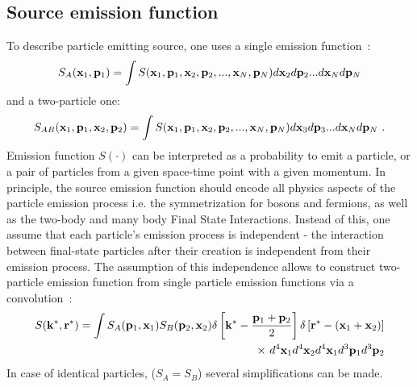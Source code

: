     \subsection{Source emission function}
    \label{sec:source-emission-function}
      To describe particle emitting source, one uses a single emission function~\cite{nonidfemto}:
      \begin{equation}
        \label{eq:source-single-3d}
        S_A(\mathbf{x}_1,\mathbf{p}_1) = \int S(\mathbf{x}_1,\mathbf{p}_1,\mathbf{x}_2,\mathbf{p}_2,...,\mathbf{x}_N,\mathbf{p}_N)
        d \mathbf{x}_2 d \mathbf{p}_2 ... d \mathbf{x}_N d \mathbf{p}_N
      \end{equation}
      and a two-particle one:
      \begin{equation}
        \label{eq:source-two-3d}
        S_{AB}(\mathbf{x}_1,\mathbf{p}_1,\mathbf{x}_2,\mathbf{p}_2) = \int S(\mathbf{x}_1,\mathbf{p}_1,\mathbf{x}_2,\mathbf{p}_2,...,\mathbf{x}_N,\mathbf{p}_N)
        d \mathbf{x}_3 d \mathbf{p}_3 ... d \mathbf{x}_N d \mathbf{p}_N~.
      \end{equation}
      Emission function $S(\cdot)$ can be interpreted as a probability to emit a particle, or a pair of particles from a given space-time point with a given momentum.
      In principle, the source emission function should encode all physics aspects of the particle emission process i.e. the symmetrization for bosons and fermions, as well as the two-body and many body Final State Interactions.
      Instead of this, one assume that each particle's emission process is independent - the interaction between final-state particles after their creation is independent from their emission process.
      The assumption of this independence allows to construct two-particle emission function from single particle emission functions via a convolution~\cite{nonidfemto}:
      \begin{equation}
        \label{eq:source-two-conv}
        \begin{split}
          S(\mathbf{k}^{*},\mathbf{r}^{*}) = \int S_A ( \mathbf{p}_1, \mathbf{x}_1 ) S_B ( \mathbf{p}_2, \mathbf{x}_2 )
          \delta \left[\mathbf{k}^{*} - \frac{\mathbf{p}_1+\mathbf{p}_2}{2} \right]
          \delta \left[\mathbf{r}^{*} - (\mathbf{x}_1+\mathbf{x}_2) \right] \\
          \times~d^4 \mathbf{x}_1 d^4 \mathbf{x}_2 d^4 \mathbf{x}_1 d^3 \mathbf{p}_1 d^3 \mathbf{p}_2
        \end{split}
      \end{equation}
      In case of identical particles, ($S_A = S_B$) several simplifications can be made.

